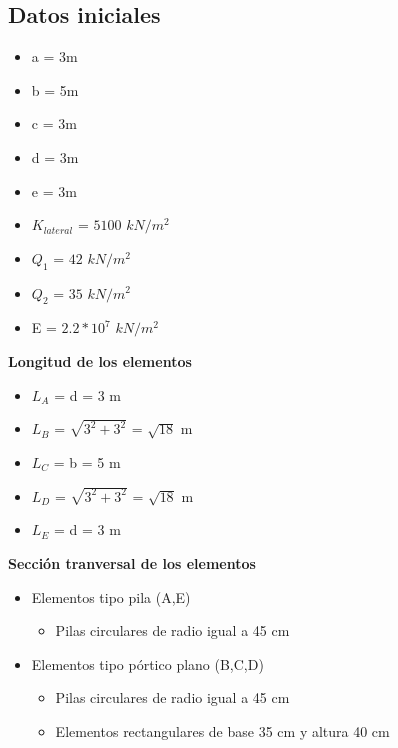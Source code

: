 \documentclass[a4paper]{article}
\begin{document}
\subsection{Datos iniciales}
\vspace{0.4cm}
\begin{itemize}
    \item a = 3m
    \item b = 5m
    \item c = 3m
    \item d = 3m
    \item e = 3m
    \item $K_{lateral}$ = $5100$ $kN/m^2$
    \item $Q_1$ = $42$ $kN/m^2$
    \item $Q_2$ = $35$ $kN/m^2$
    \item E = $2.2*10^7$ $kN/m^2$ 
\end{itemize}
\textbf{Longitud de los elementos}
\vspace{0.3cm}
\begin{itemize}
    \item $L_A$ = d = 3 m
    \item $L_B$ = $\sqrt{3^2+3^2}$ = $\sqrt{18}$ m 
    \item $L_C$ = b = 5 m
    \item $L_D$ = $\sqrt{3^2+3^2}$ = $\sqrt{18}$ m
    \item $L_E$ = d = 3 m
\end{itemize}
\textbf{Sección tranversal de los elementos}

\begin{itemize}
    \item Elementos tipo pila (A,E)
        \begin{itemize}
        \item Pilas circulares de radio igual a 45 cm
    \end{itemize}
    \end{itemize}
    \begin{itemize}
    \item Elementos tipo pórtico plano (B,C,D)
    \begin{itemize}
        \item Pilas circulares de radio igual a 45 cm
    
        \item Elementos rectangulares de base 35 cm y altura 40 cm
    
    \end{itemize}
\end{itemize}
\end{document}
